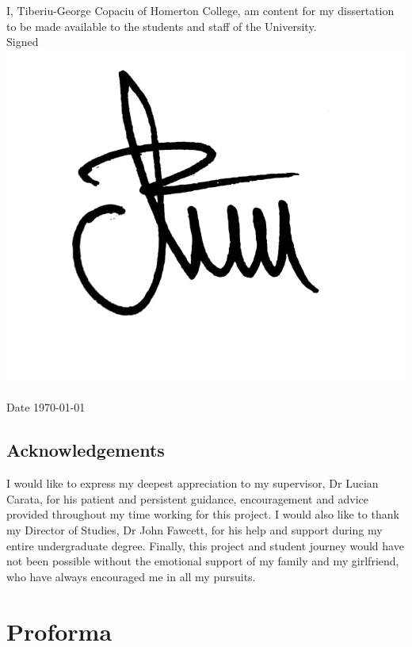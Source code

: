 \documentclass[12pt,a4paper,oneside]{report}
\begin{document}
\noindent
I, Tiberiu-George Copaciu of Homerton College,
am content for my dissertation to be made available to the students and staff of the University. \\

\noindent
Signed
\includegraphics[height=1.5\baselineskip]{Images/signature.jpg}
\\ \\
Date \today

\section*{Acknowledgements}

I would like to express my deepest appreciation to my supervisor, Dr Lucian Carata, for his patient and persistent guidance, encouragement and advice provided throughout my time working for this project. I would also like to thank my Director of Studies, Dr John Fawcett, for his help and support during my entire undergraduate degree. Finally, this project and student journey would have not been possible without the emotional support of my family and my girlfriend, who have always encouraged me in all my pursuits.

\newpage

\chapter*{Proforma}
\end{document}
